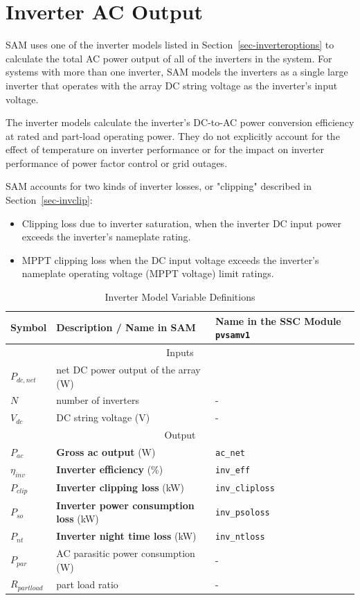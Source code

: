\documentclass[12pt,letterpaper]{article}
\begin{document}
\chapter{Inverter AC Output}\label{sec-inverter}

SAM uses one of the inverter models listed in Section~\ref{sec-inverteroptions} to calculate the total AC power output of all of the inverters in the system. For systems with more than one inverter, SAM models the inverters as a single large inverter that operates with the array DC string voltage as the inverter's input voltage. 

The inverter models calculate the inverter's DC-to-AC power conversion efficiency at rated and part-load operating power. They do not explicitly account for the effect of temperature on inverter performance or for the impact on inverter performance of power factor control or grid outages. 

SAM accounts for two kinds of inverter losses, or "clipping" described in Section~\ref{sec-invclip}:

\begin{itemize}
\item Clipping loss due to inverter saturation, when the inverter DC input power exceeds the inverter's nameplate rating.
\item MPPT clipping loss when the DC input voltage exceeds the inverter's nameplate operating voltage (MPPT voltage) limit ratings.
\end{itemize}

\begin{table}
\begin{center}
\caption{Inverter Model Variable Definitions}
\begin{tabular}{lll}
\midrule
Symbol & Description / \textbf{Name in SAM} & Name in the SSC Module \texttt{pvsamv1}\\
\midrule
\multicolumn{3}{c}{Inputs}\\
$P_{dc,net}$ & net DC power output of the array (W)& \\
$N$ & number of inverters & - \\
$V_{dc}$ & DC string voltage (V)& - \\
\midrule
\multicolumn{3}{c}{Output}\\
$P_{ac}$ & \textbf{Gross ac output} (W) & \texttt{ac\_net} \\
$\eta_{inv}$ & \textbf{Inverter efficiency} (\%)& \texttt{inv\_eff}  \\
$P_{clip}$ & \textbf{Inverter clipping loss} (kW)& \texttt{inv\_cliploss}  \\
$P_{so}$ & \textbf{Inverter power consumption loss} (kW)& \texttt{inv\_psoloss}  \\
$P_{nt}$ & \textbf{Inverter night time loss} (kW)& \texttt{inv\_ntloss}  \\
$P_{par}$ & AC parasitic power consumption (W) & - \\%
$R_{partload}$ & part load ratio & - \\
\midrule
\end{tabular}
\label{tab-invertervars}
\end{center}
\end{table}
\end{document}
